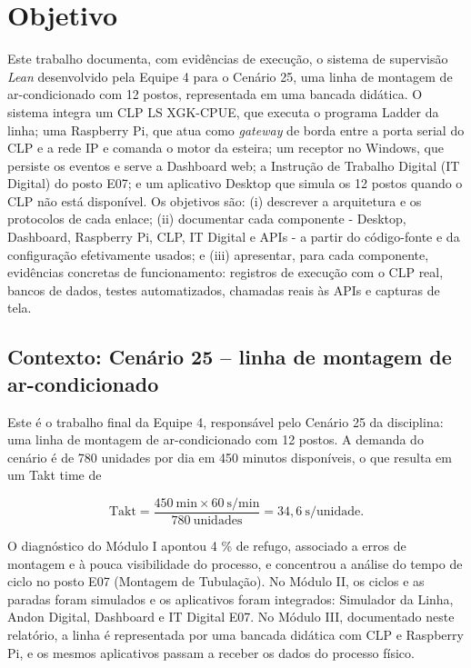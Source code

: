 \section{Objetivo}

Este trabalho documenta, com evidências de execução, o sistema de supervisão \textit{Lean} desenvolvido pela Equipe 4 para o Cenário 25, uma linha de montagem de ar-condicionado com 12 postos, representada em uma bancada didática. O sistema integra um CLP LS XGK-CPUE, que executa o programa Ladder da linha; uma Raspberry Pi, que atua como \textit{gateway} de borda entre a porta serial do CLP e a rede IP e comanda o motor da esteira; um receptor no Windows, que persiste os eventos e serve a Dashboard web; a Instrução de Trabalho Digital (IT Digital) do posto E07; e um aplicativo Desktop que simula os 12 postos quando o CLP não está disponível. Os objetivos são: (i) descrever a arquitetura e os protocolos de cada enlace; (ii) documentar cada componente - Desktop, Dashboard, Raspberry Pi, CLP, IT Digital e APIs - a partir do código-fonte e da configuração efetivamente usados; e (iii) apresentar, para cada componente, evidências concretas de funcionamento: registros de execução com o CLP real, bancos de dados, testes automatizados, chamadas reais às APIs e capturas de tela.

\subsection{Contexto: Cenário 25 -- linha de montagem de ar-condicionado}

Este é o trabalho final da Equipe 4, responsável pelo Cenário 25 da disciplina: uma linha de montagem de ar-condicionado com 12 postos. A demanda do cenário é de 780 unidades por dia em 450 minutos disponíveis, o que resulta em um Takt time de

\[
\text{Takt} = \frac{450\ \text{min} \times 60\ \text{s/min}}{780\ \text{unidades}} = 34{,}6\ \text{s/unidade}.
\]

O diagnóstico do Módulo I apontou 4 \% de refugo, associado a erros de montagem e à pouca visibilidade do processo, e concentrou a análise do tempo de ciclo no posto E07 (Montagem de Tubulação). No Módulo II, os ciclos e as paradas foram simulados e os aplicativos foram integrados: Simulador da Linha, Andon Digital, Dashboard e IT Digital E07. No Módulo III, documentado neste relatório, a linha é representada por uma bancada didática com CLP e Raspberry Pi, e os mesmos aplicativos passam a receber os dados do processo físico.

